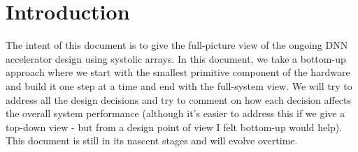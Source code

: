 \section{Introduction}
The intent of this document is to give the full-picture view of the ongoing DNN accelerator design using systolic arrays. In this document, we take a bottom-up approach where we start with the smallest primitive component of the hardware and build it one step at a time and end with the full-system view. We will try to address all the design decisions and try to comment on how each decision affects the overall system performance (although it's easier to address this if we give a top-down view - but from a design point of view I felt bottom-up would help). This document is still in its nascent stages and will evolve overtime. 

